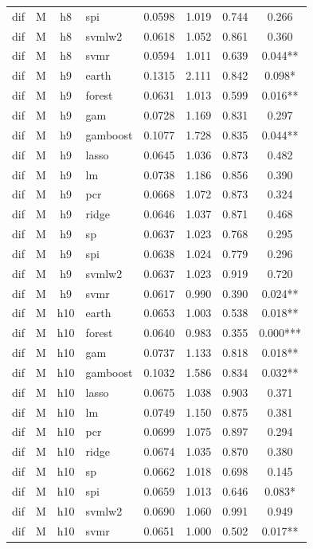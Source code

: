 \begin{ThreePartTable}
\begin{longtable}[t]{llclcccc}
dif & M & h8 & spi & 0.0598 & 1.019 & 0.744 & 0.266\\
dif & M & h8 & svmlw2 & 0.0618 & 1.052 & 0.861 & 0.360\\
dif & M & h8 & svmr & 0.0594 & 1.011 & 0.639 & 0.044**\\
\addlinespace
dif & M & h9 & earth & 0.1315 & 2.111 & 0.842 & 0.098*\\
dif & M & h9 & forest & 0.0631 & 1.013 & 0.599 & 0.016**\\
dif & M & h9 & gam & 0.0728 & 1.169 & 0.831 & 0.297\\
dif & M & h9 & gamboost & 0.1077 & 1.728 & 0.835 & 0.044**\\
dif & M & h9 & lasso & 0.0645 & 1.036 & 0.873 & 0.482\\
dif & M & h9 & lm & 0.0738 & 1.186 & 0.856 & 0.390\\
dif & M & h9 & pcr & 0.0668 & 1.072 & 0.873 & 0.324\\
dif & M & h9 & ridge & 0.0646 & 1.037 & 0.871 & 0.468\\
dif & M & h9 & sp & 0.0637 & 1.023 & 0.768 & 0.295\\
dif & M & h9 & spi & 0.0638 & 1.024 & 0.779 & 0.296\\
dif & M & h9 & svmlw2 & 0.0637 & 1.023 & 0.919 & 0.720\\
dif & M & h9 & svmr & 0.0617 & 0.990 & 0.390 & 0.024**\\
\addlinespace
dif & M & h10 & earth & 0.0653 & 1.003 & 0.538 & 0.018**\\
dif & M & h10 & forest & 0.0640 & 0.983 & 0.355 & 0.000***\\
dif & M & h10 & gam & 0.0737 & 1.133 & 0.818 & 0.018**\\
dif & M & h10 & gamboost & 0.1032 & 1.586 & 0.834 & 0.032**\\
dif & M & h10 & lasso & 0.0675 & 1.038 & 0.903 & 0.371\\
dif & M & h10 & lm & 0.0749 & 1.150 & 0.875 & 0.381\\
dif & M & h10 & pcr & 0.0699 & 1.075 & 0.897 & 0.294\\
dif & M & h10 & ridge & 0.0674 & 1.035 & 0.870 & 0.380\\
dif & M & h10 & sp & 0.0662 & 1.018 & 0.698 & 0.145\\
dif & M & h10 & spi & 0.0659 & 1.013 & 0.646 & 0.083*\\
dif & M & h10 & svmlw2 & 0.0690 & 1.060 & 0.991 & 0.949\\
dif & M & h10 & svmr & 0.0651 & 1.000 & 0.502 & 0.017**\\

\end{longtable}
\end{ThreePartTable}
